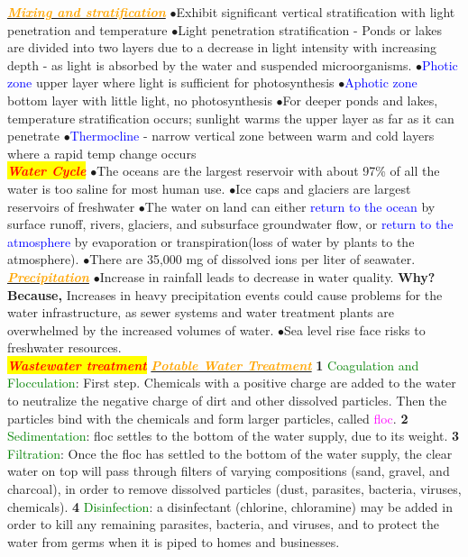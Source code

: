 \documentclass{article}
\newcommand{\ddd}{$\bullet$}
\newcommand{\red}[1]{\textcolor{red}{#1}}
\newcommand{\green}[1]{\textcolor{green}{#1}}
\newcommand{\blue}[1]{\textcolor{blue}{#1}}
\newcommand{\pink}[1]{\textcolor{magenta}{#1}}
\newcommand{\orange}[1]{\textcolor{orange}{#1}}
\newcommand{\mysection}[1]{\colorbox{yellow}{\textbf{\textit{\red{#1}}}}}
\newcommand{\mysubsection}[1]{\underline{\textbf{{\textit{\orange{#1}}}}}}
\newcommand{\mysubsub}[1]{{{\green{#1}}}}
\begin{document}
\begin{multicols*}{4}
        \mysubsection{Mixing and stratification}
            \ddd Exhibit significant vertical stratification with light penetration and temperature 
            \ddd Light penetration stratification - Ponds or lakes are divided into two layers due to a decrease in light intensity with increasing depth - as light is absorbed by the water and suspended microorganisms.
            \ddd \blue{Photic zone} upper layer where light is sufficient for photosynthesis
            \ddd \blue{Aphotic zone} bottom layer with little light, no photosynthesis
            \ddd For deeper ponds and lakes, temperature stratification occurs; sunlight warms the upper layer as far as it can penetrate
            \ddd \blue{Thermocline} - narrow vertical zone between warm and cold layers where a rapid temp change occurs \\
	  \mysection{Water Cycle}
	    \ddd The oceans are the largest reservoir with about 97\% of all the water is too saline for most human use.
	    \ddd Ice caps and glaciers are largest reservoirs of freshwater 
	    \ddd The water on land can either \blue{return to the ocean} by surface runoff, rivers, glaciers, and subsurface groundwater flow, or \blue{return to the atmosphere} by evaporation or transpiration(loss of water by plants to the atmosphere).
	    \ddd There are 35,000 mg of dissolved ions per liter of seawater.
	    \mysubsection{Precipitation}
	        \ddd Increase in rainfall leads to decrease in water quality. \textbf{Why? Because, } Increases in heavy precipitation events could cause problems for the water infrastructure, as sewer systems and water treatment plants are overwhelmed by the increased volumes of water. 
	        \ddd Sea level rise face risks to freshwater resources.
	 \\
    \mysection{Wastewater treatment}
    	\mysubsection{Potable Water Treatment}
    		\textbf{1} \mysubsub{Coagulation and Flocculation}: First step. Chemicals with a positive charge are added to the water to neutralize the negative charge of dirt and other dissolved particles. Then the particles bind with the chemicals and form larger particles, called \pink{floc}.
    		\textbf{2} \mysubsub{Sedimentation}: floc settles to the bottom of the water supply, due to its weight.
    		\textbf{3} \mysubsub{Filtration}: Once the floc has settled to the bottom of the water supply, the clear water on top will pass through filters of varying compositions (sand, gravel, and charcoal), in order to remove dissolved particles (dust, parasites, bacteria, viruses, chemicals).
    		\textbf{4} \mysubsub{Disinfection}: a disinfectant (chlorine, chloramine) may be added in order to kill any remaining parasites, bacteria, and viruses, and to protect the water from germs when it is piped to homes and businesses.

\end{multicols*}
\end{document}
